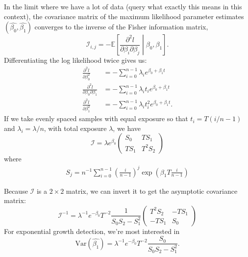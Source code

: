 \documentclass[12pt, letterpaper]{article}
\begin{document}
In the limit where we have a lot of data (query what exactly this means in this context), the covariance matrix of the maximum likelihood parameter estimates $(\hat{\beta_0}, \hat{\beta_1})$ converges to the inverse of the Fisher information matrix,
\begin{equation}
    \mathcal{I}_{i, j} = - \mathbb{E} \left[ \frac{\partial^2 l}{\partial \beta_i \partial \beta_j} \middle| \beta_0, \beta_1 \right].
\end{equation}
Differentiating the log likelihood twice gives us:
\begin{align}
    \frac{\partial^2 l}{\partial \beta_0^2}
    &= - \sum_{i=0}^{n-1} \lambda_i e^{\beta_0 + \beta_1 t} \\
    \frac{\partial^2 l}{\partial \beta_0 \partial \beta_1}
    &= - \sum_{i=0}^{n-1} \lambda_i t_i e^{\beta_0 + \beta_1 t} \\
    \frac{\partial^2 l}{\partial \beta_1^2}
    &= - \sum_{i=0}^{n-1} \lambda_i t_i^2 e^{\beta_0 + \beta_1 t}.
\end{align}
If we take evenly spaced samples with equal exposure so that $t_i = T(i/n-1)$ and $\lambda_i = \lambda / n$, with total exposure $\lambda$, we have
\begin{equation}
    \mathcal{I} = \lambda e^{\beta_0}
    \begin{pmatrix}
        S_0 & T S_1 \\
        T S_1 & T^2 S_2
    \end{pmatrix}
\end{equation}
where
\begin{align}
    S_j = n^{-1} \sum_{i=0}^{n-1} {\left(\frac{i}{n-1}\right)}^j \exp\left(\beta_1 T \frac{i}{n-1}\right)
\end{align}

Because $\mathcal{I}$ is a $2 \times 2$ matrix, we can invert it to get the asymptotic covariance matrix:
\begin{equation}
    {\mathcal{I}}^{-1} = \lambda^{-1} e^{-\beta_0} T^{-2} \frac{1}{S_0 S_2 - S_1^2}
    \begin{pmatrix}
        T^2 S_2 & -T S_1 \\
        -T S_1 & S_0
    \end{pmatrix}
\end{equation}
For exponential growth detection, we're most interested in
\begin{equation}
    \textrm{Var}(\hat{\beta_1}) = \lambda^{-1} e^{-\beta_0} T^{-2} \frac{S_0}{S_0 S_2 - S_1^2}.
    \label{eq:var}
\end{equation}
\end{document}
